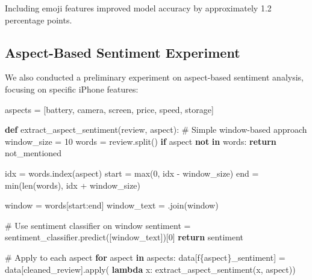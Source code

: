 \documentclass[
]{article}
\newenvironment{Shaded}{\begin{snugshade}}{\end{snugshade}}
\newcommand{\BuiltInTok}[1]{\textcolor[rgb]{0.00,0.23,0.31}{#1}}
\newcommand{\CommentTok}[1]{\textcolor[rgb]{0.37,0.37,0.37}{#1}}
\newcommand{\ControlFlowTok}[1]{\textcolor[rgb]{0.00,0.23,0.31}{\textbf{#1}}}
\newcommand{\DecValTok}[1]{\textcolor[rgb]{0.68,0.00,0.00}{#1}}
\newcommand{\KeywordTok}[1]{\textcolor[rgb]{0.00,0.23,0.31}{\textbf{#1}}}
\newcommand{\NormalTok}[1]{\textcolor[rgb]{0.00,0.23,0.31}{#1}}
\newcommand{\OperatorTok}[1]{\textcolor[rgb]{0.37,0.37,0.37}{#1}}
\newcommand{\SpecialCharTok}[1]{\textcolor[rgb]{0.37,0.37,0.37}{#1}}
\newcommand{\SpecialStringTok}[1]{\textcolor[rgb]{0.13,0.47,0.30}{#1}}
\newcommand{\StringTok}[1]{\textcolor[rgb]{0.13,0.47,0.30}{#1}}
\begin{document}
Including emoji features improved model accuracy by approximately 1.2
percentage points.

\subsection{Aspect-Based Sentiment
Experiment}\label{aspect-based-sentiment-experiment}

We also conducted a preliminary experiment on aspect-based sentiment
analysis, focusing on specific iPhone features:

\begin{Shaded}
\begin{Highlighting}[]
\NormalTok{aspects }\OperatorTok{=}\NormalTok{ [}\StringTok{\textquotesingle{}battery\textquotesingle{}}\NormalTok{, }\StringTok{\textquotesingle{}camera\textquotesingle{}}\NormalTok{, }\StringTok{\textquotesingle{}screen\textquotesingle{}}\NormalTok{, }\StringTok{\textquotesingle{}price\textquotesingle{}}\NormalTok{, }\StringTok{\textquotesingle{}speed\textquotesingle{}}\NormalTok{, }\StringTok{\textquotesingle{}storage\textquotesingle{}}\NormalTok{]}

\KeywordTok{def}\NormalTok{ extract\_aspect\_sentiment(review, aspect):}
    \CommentTok{\# Simple window{-}based approach}
\NormalTok{    window\_size }\OperatorTok{=} \DecValTok{10}
\NormalTok{    words }\OperatorTok{=}\NormalTok{ review.split()}
    \ControlFlowTok{if}\NormalTok{ aspect }\KeywordTok{not} \KeywordTok{in}\NormalTok{ words:}
        \ControlFlowTok{return} \StringTok{\textquotesingle{}not\_mentioned\textquotesingle{}}
    
\NormalTok{    idx }\OperatorTok{=}\NormalTok{ words.index(aspect)}
\NormalTok{    start }\OperatorTok{=} \BuiltInTok{max}\NormalTok{(}\DecValTok{0}\NormalTok{, idx }\OperatorTok{{-}}\NormalTok{ window\_size)}
\NormalTok{    end }\OperatorTok{=} \BuiltInTok{min}\NormalTok{(}\BuiltInTok{len}\NormalTok{(words), idx }\OperatorTok{+}\NormalTok{ window\_size)}
    
\NormalTok{    window }\OperatorTok{=}\NormalTok{ words[start:end]}
\NormalTok{    window\_text }\OperatorTok{=} \StringTok{\textquotesingle{} \textquotesingle{}}\NormalTok{.join(window)}
    
    \CommentTok{\# Use sentiment classifier on window}
\NormalTok{    sentiment }\OperatorTok{=}\NormalTok{ sentiment\_classifier.predict([window\_text])[}\DecValTok{0}\NormalTok{]}
    \ControlFlowTok{return}\NormalTok{ sentiment}

\CommentTok{\# Apply to each aspect}
\ControlFlowTok{for}\NormalTok{ aspect }\KeywordTok{in}\NormalTok{ aspects:}
\NormalTok{    data[}\SpecialStringTok{f\textquotesingle{}}\SpecialCharTok{\{}\NormalTok{aspect}\SpecialCharTok{\}}\SpecialStringTok{\_sentiment\textquotesingle{}}\NormalTok{] }\OperatorTok{=}\NormalTok{ data[}\StringTok{\textquotesingle{}cleaned\_review\textquotesingle{}}\NormalTok{].}\BuiltInTok{apply}\NormalTok{(}
        \KeywordTok{lambda}\NormalTok{ x: extract\_aspect\_sentiment(x, aspect))}
\end{Highlighting}
\end{Shaded}
\end{document}
